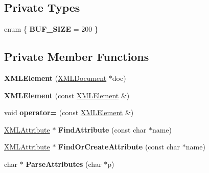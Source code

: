 \subsection*{Private Types}
\begin{DoxyCompactItemize}
\item 
\hypertarget{classtinyxml2_1_1_x_m_l_element_a80c7baddad73eb79786555f790687ada}{}enum \{ {\bfseries B\+U\+F\+\_\+\+S\+I\+Z\+E} = 200
 \}\label{classtinyxml2_1_1_x_m_l_element_a80c7baddad73eb79786555f790687ada}

\end{DoxyCompactItemize}
\subsection*{Private Member Functions}
\begin{DoxyCompactItemize}
\item 
\hypertarget{classtinyxml2_1_1_x_m_l_element_a52484940e20f3734e6edc5e5c3af2dbc}{}{\bfseries X\+M\+L\+Element} (\hyperlink{classtinyxml2_1_1_x_m_l_document}{X\+M\+L\+Document} $\ast$doc)\label{classtinyxml2_1_1_x_m_l_element_a52484940e20f3734e6edc5e5c3af2dbc}

\item 
\hypertarget{classtinyxml2_1_1_x_m_l_element_a1aa8ab977a1799bf118efb158248351b}{}{\bfseries X\+M\+L\+Element} (const \hyperlink{classtinyxml2_1_1_x_m_l_element}{X\+M\+L\+Element} \&)\label{classtinyxml2_1_1_x_m_l_element_a1aa8ab977a1799bf118efb158248351b}

\item 
\hypertarget{classtinyxml2_1_1_x_m_l_element_ae300366701a54d4b6d1c287d9b5209a7}{}void {\bfseries operator=} (const \hyperlink{classtinyxml2_1_1_x_m_l_element}{X\+M\+L\+Element} \&)\label{classtinyxml2_1_1_x_m_l_element_ae300366701a54d4b6d1c287d9b5209a7}

\item 
\hypertarget{classtinyxml2_1_1_x_m_l_element_ac2415a711ab18516cd7a8eb8eea01cd6}{}\hyperlink{classtinyxml2_1_1_x_m_l_attribute}{X\+M\+L\+Attribute} $\ast$ {\bfseries Find\+Attribute} (const char $\ast$name)\label{classtinyxml2_1_1_x_m_l_element_ac2415a711ab18516cd7a8eb8eea01cd6}

\item 
\hypertarget{classtinyxml2_1_1_x_m_l_element_a4463788edbc3130f5f68eb732b9f323d}{}\hyperlink{classtinyxml2_1_1_x_m_l_attribute}{X\+M\+L\+Attribute} $\ast$ {\bfseries Find\+Or\+Create\+Attribute} (const char $\ast$name)\label{classtinyxml2_1_1_x_m_l_element_a4463788edbc3130f5f68eb732b9f323d}

\item 
\hypertarget{classtinyxml2_1_1_x_m_l_element_a258b2b7077f6adfd1a686042a09cdd6e}{}char $\ast$ {\bfseries Parse\+Attributes} (char $\ast$p)\label{classtinyxml2_1_1_x_m_l_element_a258b2b7077f6adfd1a686042a09cdd6e}

\end{DoxyCompactItemize}
